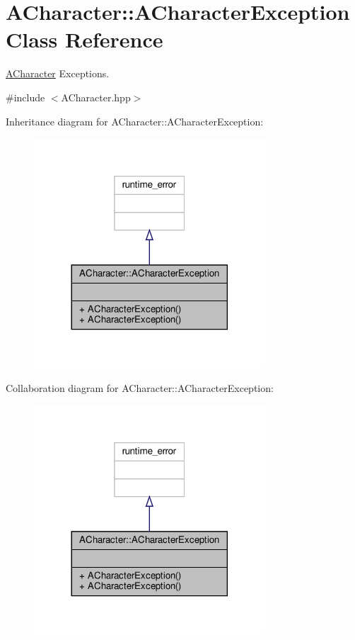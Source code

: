 \hypertarget{class_a_character_1_1_a_character_exception}{}\section{A\+Character\+:\+:A\+Character\+Exception Class Reference}
\label{class_a_character_1_1_a_character_exception}


\hyperlink{class_a_character}{A\+Character} Exceptions.  




{\ttfamily \#include $<$A\+Character.\+hpp$>$}



Inheritance diagram for A\+Character\+:\+:A\+Character\+Exception\+:
\nopagebreak
\begin{figure}[H]
\begin{center}
\leavevmode
\includegraphics[width=245pt]{class_a_character_1_1_a_character_exception__inherit__graph}
\end{center}
\end{figure}


Collaboration diagram for A\+Character\+:\+:A\+Character\+Exception\+:
\nopagebreak
\begin{figure}[H]
\begin{center}
\leavevmode
\includegraphics[width=245pt]{class_a_character_1_1_a_character_exception__coll__graph}
\end{center}
\end{figure}
